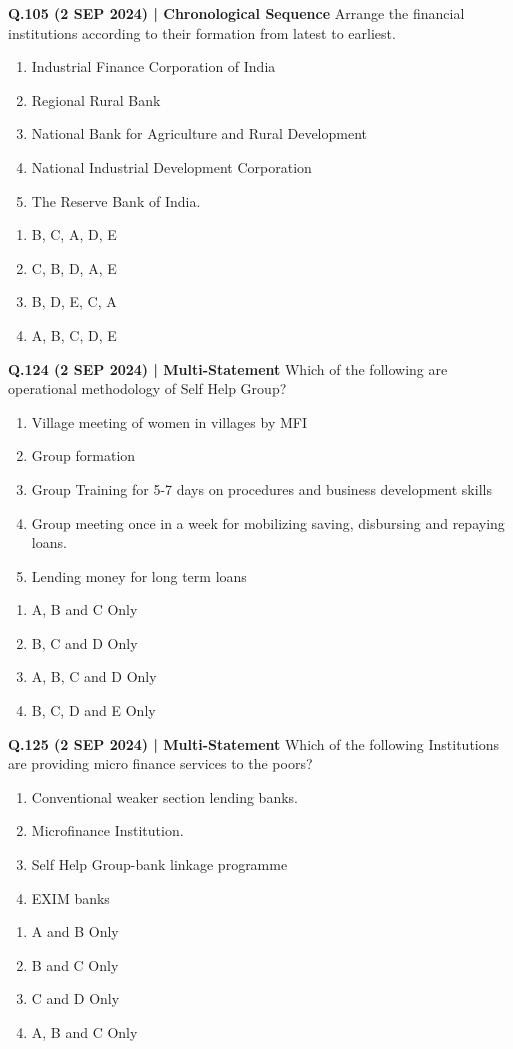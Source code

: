 \documentclass{article}
\begin{document}
\textbf{Q.105 (2 SEP 2024) | Chronological Sequence}
Arrange the financial institutions according to their formation from latest to earliest.
\begin{enumerate}[label=\Alph*.]
    \item Industrial Finance Corporation of India
    \item Regional Rural Bank
    \item National Bank for Agriculture and Rural Development
    \item National Industrial Development Corporation
    \item The Reserve Bank of India.
\end{enumerate}
\begin{enumerate}[label=(\arabic*)]
    \item B, C, A, D, E
    \item C, B, D, A, E
    \item B, D, E, C, A
    \item A, B, C, D, E
\end{enumerate}

\textbf{Q.124 (2 SEP 2024) | Multi-Statement}
Which of the following are operational methodology of Self Help Group?
\begin{enumerate}[label=\Alph*.]
    \item Village meeting of women in villages by MFI
    \item Group formation
    \item Group Training for 5-7 days on procedures and business development skills
    \item Group meeting once in a week for mobilizing saving, disbursing and repaying loans.
    \item Lending money for long term loans
\end{enumerate}
\begin{enumerate}[label=(\arabic*)]
    \item A, B and C Only
    \item B, C and D Only
    \item A, B, C and D Only
    \item B, C, D and E Only
\end{enumerate}

\textbf{Q.125 (2 SEP 2024) | Multi-Statement}
Which of the following Institutions are providing micro finance services to the poors?
\begin{enumerate}[label=\Alph*.]
    \item Conventional weaker section lending banks.
    \item Microfinance Institution.
    \item Self Help Group-bank linkage programme
    \item EXIM banks
\end{enumerate}
\begin{enumerate}[label=(\arabic*)]
    \item A and B Only
    \item B and C Only
    \item C and D Only
    \item A, B and C Only
\end{enumerate}
\end{document}
